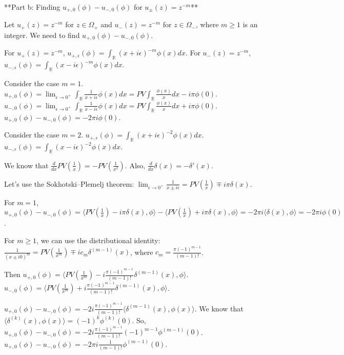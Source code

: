 **Part b: Finding $u_{+,0}(\phi) - u_{-,0}(\phi)$ for $u_{\pm}(z) = z^{-m}$**

Let $u_+(z) = z^{-m}$ for $z \in \Omega_+$ and $u_-(z) = z^{-m}$ for $z \in \Omega_-$, where $m \geq 1$ is an integer.
We need to find $u_{+,0}(\phi) - u_{-,0}(\phi)$.

For $u_+(z) = z^{-m}$, $u_{+,\epsilon}(\phi) = \int_{\mathbb{R}} (x + i\epsilon)^{-m} \phi(x) dx$.
For $u_-(z) = z^{-m}$, $u_{-,\epsilon}(\phi) = \int_{\mathbb{R}} (x - i\epsilon)^{-m} \phi(x) dx$.

Consider the case $m=1$.
$u_{+,0}(\phi) = \lim_{\epsilon \rightarrow 0^+} \int_{\mathbb{R}} \frac{1}{x + i\epsilon} \phi(x) dx = PV \int_{\mathbb{R}} \frac{\phi(x)}{x} dx - i \pi \phi(0)$.
$u_{-,0}(\phi) = \lim_{\epsilon \rightarrow 0^+} \int_{\mathbb{R}} \frac{1}{x - i\epsilon} \phi(x) dx = PV \int_{\mathbb{R}} \frac{\phi(x)}{x} dx + i \pi \phi(0)$.
$u_{+,0}(\phi) - u_{-,0}(\phi) = -2 \pi i \phi(0)$.

Consider the case $m=2$.
$u_{+,\epsilon}(\phi) = \int_{\mathbb{R}} (x + i\epsilon)^{-2} \phi(x) dx$.
$u_{-,\epsilon}(\phi) = \int_{\mathbb{R}} (x - i\epsilon)^{-2} \phi(x) dx$.

We know that $\frac{d}{dx} PV(\frac{1}{x}) = -PV(\frac{1}{x^2})$.
Also, $\frac{d}{dx} \delta(x) = -\delta'(x)$.

Let's use the Sokhotski–Plemelj theorem:
$\lim_{\epsilon \rightarrow 0^+} \frac{1}{x \pm i\epsilon} = PV(\frac{1}{x}) \mp i \pi \delta(x)$.

For $m=1$, $u_{+,0}(\phi) - u_{-,0}(\phi) = \langle PV(\frac{1}{x}) - i \pi \delta(x), \phi \rangle - \langle PV(\frac{1}{x}) + i \pi \delta(x), \phi \rangle = -2 \pi i \langle \delta(x), \phi \rangle = -2 \pi i \phi(0)$.

For $m \geq 1$, we can use the distributional identity:
$\frac{1}{(x \pm i0)^m} = PV(\frac{1}{x^m}) \mp i c_m \delta^{(m-1)}(x)$, where $c_m = \frac{\pi (-1)^{m-1}}{(m-1)!}$.

Then $u_{+,0}(\phi) = \langle PV(\frac{1}{x^m}) - i \frac{\pi (-1)^{m-1}}{(m-1)!} \delta^{(m-1)}(x), \phi \rangle$.
$u_{-,0}(\phi) = \langle PV(\frac{1}{x^m}) + i \frac{\pi (-1)^{m-1}}{(m-1)!} \delta^{(m-1)}(x), \phi \rangle$.

$u_{+,0}(\phi) - u_{-,0}(\phi) = -2 i \frac{\pi (-1)^{m-1}}{(m-1)!} \langle \delta^{(m-1)}(x), \phi(x) \rangle$.
We know that $\langle \delta^{(k)}(x), \phi(x) \rangle = (-1)^k \phi^{(k)}(0)$.
So, $u_{+,0}(\phi) - u_{-,0}(\phi) = -2 i \frac{\pi (-1)^{m-1}}{(m-1)!} (-1)^{m-1} \phi^{(m-1)}(0)$.
$u_{+,0}(\phi) - u_{-,0}(\phi) = -2 \pi i \frac{1}{(m-1)!} \phi^{(m-1)}(0)$.

